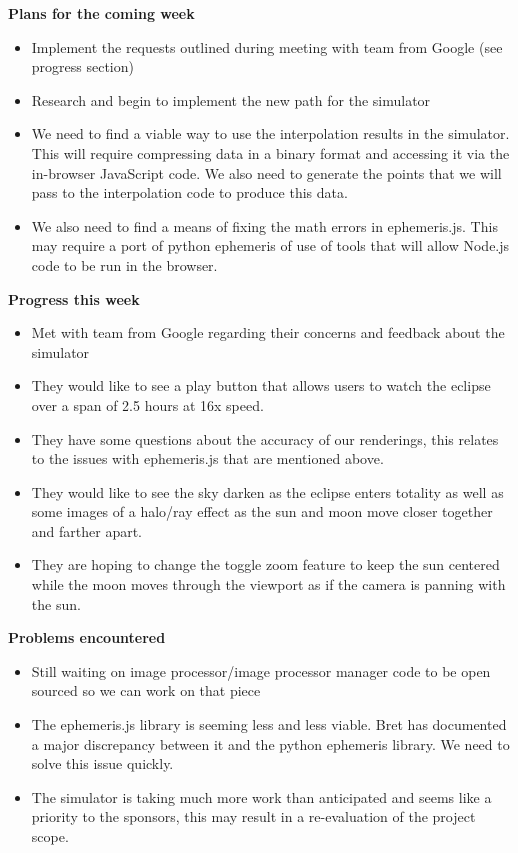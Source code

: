 \documentclass[10pt, onecolumn, draftclsnofoot, letterpaper, compsoc]{IEEEtran}
\begin{document}
    \noindent \textbf{Plans for the coming week}

    \begin{itemize}

    \item Implement the requests outlined during meeting with team from Google (see progress section)
    \item Research and begin to implement the new path for the simulator
      \item We need to find a viable way to use the interpolation results in the simulator.
      This will require compressing data in a binary format and accessing it via the in-browser
      JavaScript code. We also need to generate the points that we will pass to the
      interpolation code to produce this data.
      \item We also need to find a means of fixing the math errors in ephemeris.js. This
      may require a port of python ephemeris of use of tools that will allow Node.js code to be run in the browser.

      \end{itemize}

    \noindent \textbf{Progress this week}

    \begin{itemize}

    \item Met with team from Google regarding their concerns and feedback about the simulator
      \item They would like to see a play button that allows users to watch the eclipse over a span of 2.5 hours at 16x speed.
      \item They have some questions about the accuracy of our renderings, this relates to
      the issues with ephemeris.js that are mentioned above.
      \item They would like to see the sky darken as the eclipse enters totality as
      well as some images of a halo/ray effect as the sun and moon move closer together and farther apart.
      \item They are hoping to change the toggle zoom feature to keep the sun centered
      while the moon moves through the viewport as if the camera is panning with the sun.

    \end{itemize}

    \noindent \textbf{Problems encountered}

    \begin{itemize}

    \item Still waiting on image processor/image processor manager code to be open sourced so we can work on that piece
    \item The ephemeris.js library is seeming less and less viable. Bret has documented
    a major discrepancy between it and the python ephemeris library. We need to solve this issue quickly.
    \item The simulator is taking much more work than anticipated and seems like a priority to the
    sponsors, this may result in a re-evaluation of the project scope.

    \end{itemize}
\end{document}
